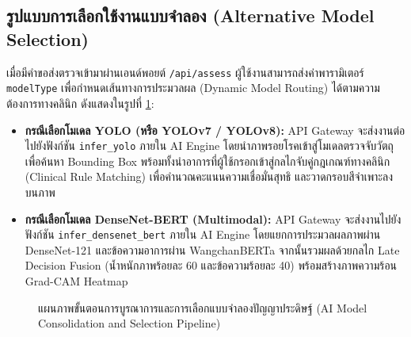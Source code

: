 \subsection{รูปแบบการเลือกใช้งานแบบจำลอง (Alternative Model Selection)}
เมื่อมีคำขอส่งตรวจเข้ามาผ่านเอนด์พอยต์ \texttt{/api/assess} ผู้ใช้งานสามารถส่งค่าพารามิเตอร์ \texttt{modelType} เพื่อกำหนดเส้นทางการประมวลผล (Dynamic Model Routing) ได้ตามความต้องการทางคลินิก ดังแสดงในรูปที่ \ref{fig:model_pipeline_diagram}:
\begin{itemize}
    \item \textbf{กรณีเลือกโมเดล YOLO (หรือ YOLOv7 / YOLOv8):} API Gateway จะส่งงานต่อไปยังฟังก์ชัน \texttt{infer\_yolo} ภายใน AI Engine โดยนำภาพรอยโรคเข้าสู่โมเดลตรวจจับวัตถุเพื่อค้นหา Bounding Box พร้อมทั้งนำอาการที่ผู้ใช้กรอกเข้าสู่กลไกจับคู่กฎเกณฑ์ทางคลินิก (Clinical Rule Matching) เพื่อคำนวณคะแนนความเชื่อมั่นสุทธิ และวาดกรอบสีจำเพาะลงบนภาพ
    \item \textbf{กรณีเลือกโมเดล DenseNet-BERT (Multimodal):} API Gateway จะส่งงานไปยังฟังก์ชัน \texttt{infer\_densenet\_bert} ภายใน AI Engine โดยแยกการประมวลผลภาพผ่าน DenseNet-121 และข้อความอาการผ่าน WangchanBERTa จากนั้นรวมผลด้วยกลไก Late Decision Fusion (น้ำหนักภาพร้อยละ 60 และข้อความร้อยละ 40) พร้อมสร้างภาพความร้อน Grad-CAM Heatmap
\end{itemize}

\begin{figure}[htbp]
\centering
{}
\caption{แผนภาพขั้นตอนการบูรณาการและการเลือกแบบจำลองปัญญาประดิษฐ์ (AI Model Consolidation and Selection Pipeline)}
\label{fig:model_pipeline_diagram}
\end{figure}

